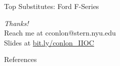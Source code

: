  \begin{frame}{Top Substitutes: Ford F-Series}
    \centering
    \\
 \end{frame}


\begin{frame}{}
  \centering \Large
  \emph{Thanks!}\\

  Reach me at cconlon@stern.nyu.edu\\

  Slides at \url{bit.ly/conlon\_IIOC}
\end{frame}


\begin{frame}{References}
    
\end{frame}

